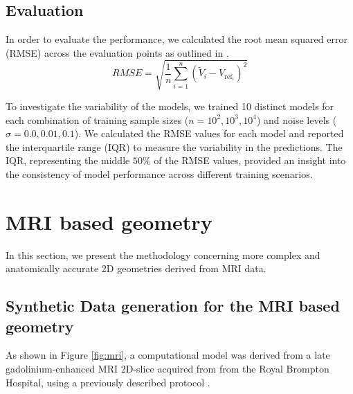 

\subsection{Evaluation}
In order to evaluate the performance, we calculated the root mean squared error (RMSE) across the evaluation points as outlined in \cite{EP-PINNs}.
\begin{equation}
RMSE = \sqrt{\frac{1}{n} \sum_{i=1}^n (\tilde{V}_i - V_{\text{ref}_i})^2}   
\end{equation}

To investigate the variability of the models, we trained 10 distinct models for each combination of training sample sizes (\(n = 10^2, 10^3, 10^4\)) and noise levels (\(\sigma = 0.0, 0.01, 0.1\)). We calculated the RMSE values for each model and reported the interquartile range (IQR) to measure the variability in the predictions. The IQR, representing the middle $50\%$ of the RMSE values, provided an insight into the consistency of model performance across different training scenarios.



\section{MRI based geometry}\label{method_MRI}
In this section, we present the methodology concerning more complex and anatomically accurate 2D geometries derived from MRI data. 
\subsection{Synthetic Data generation for the MRI based geometry}

As shown in Figure \ref{fig:mri}, a computational model was derived from a late gadolinium-enhanced MRI 2D-slice acquired from  from the Royal Brompton Hospital, using a previously described protocol \cite{gulati}. 

